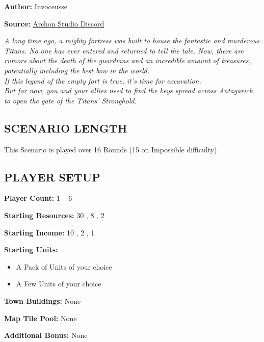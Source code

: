 
\begin{multicols*}{2}

\textbf{Author:} Invoceusse

\textbf{Source:} \href{https://discord.com/channels/740870068178649108/1219333721019256943}{Archon Studio Discord}

\textit{A long time ago, a mighty fortress was built to house the fantastic and murderous Titans.
  No one has ever entered and returned to tell the tale.
  Now, there are rumors about the death of the guardians and an incredible amount of treasures, potentially including the best bow in the world.\\
  If this legend of the empty fort is true, it's time for excavation.\\
  But for now, you and your allies need to find the keys spread across Antagarich to open the gate of the Titans' Stronghold.
}

\subsection*{\MakeUppercase{Scenario Length}}

This Scenario is played over 16 Rounds (15 on Impossible difficulty).

\subsection*{\MakeUppercase{Player Setup}}

\textbf{Player Count:} 1 -- 6

\textbf{Starting Resources:} 30 , 8 , 2 

\textbf{Starting Income:} 10 , 2 , 1 

\textbf{Starting Units:}
\begin{itemize}
  \item A Pack of  Units of your choice
  \item A Few  Units of your choice
\end{itemize}

\textbf{Town Buildings:} None

\textbf{Map Tile Pool:} None

\textbf{Additional Bonus:} None


\end{multicols*}
